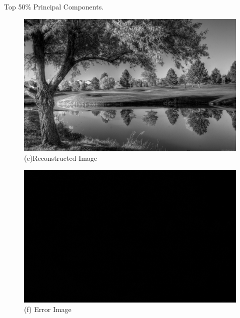 \documentclass[a4 paper]{article}
\begin{document}
Top 50\% Principal Components.
\begin{figure}[!htb]
    \centering
    \begin{minipage}{0.49\textwidth}
        \centering
        \includegraphics[width=1\textwidth]{R50.png} \\
         (e)Reconstructed Image
    \end{minipage}\hfill
    \begin{minipage}{0.49\textwidth}
        \centering
        \includegraphics[width=1\textwidth]{E50.png}\\
        (f) Error Image
    \end{minipage}
    \label{fig:l}
\end{figure}
\end{document}
